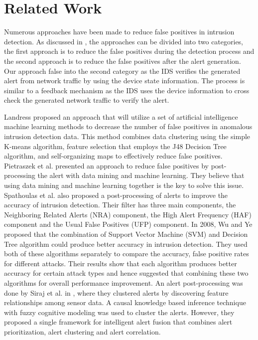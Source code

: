 \documentclass[letterpaper, 10 pt, conference]{ieeeconf}  %
\begin{document}
\section{Related Work}
Numerous approaches have been made to reduce false positives in intrusion detection. As discussed in \cite{c30}, the approaches can be divided into two categories, the first approach is to reduce the false positives during the detection process and the second approach is to reduce the false positives after the alert generation. Our approach false into the second category as the IDS verifies the generated alert from network traffic by using the device state information. The process is similar to a feedback mechanism as the IDS uses the device information to cross check the generated network traffic to verify the alert.

Landress \cite{c25} proposed an approach that will utilize a set of artificial intelligence machine learning methods to decrease the number of false positives in anomalous intrusion detection data. This method combines data clustering using the simple K-means algorithm, feature selection that employs the J48 Decision Tree algorithm, and self-organizing maps to effectively reduce false positives.
Pietraszek et al. \cite{c26} presented an approach to reduce false positives by post-processing the alert with data mining and machine learning. They believe that using data mining and machine learning together is the key to solve this issue.
Spathoulas et al. \cite{c27} also proposed a post-processing of alerts to improve the accuracy of intrusion detection. Their filter has three main components, the Neighboring Related Alerts (NRA) component, the High Alert Frequency (HAF) component and the Usual False Positives (UFP) component.
In 2008, Wu and Ye \cite{c31} proposed that the combination of Support Vector Machine (SVM) and Decision Tree algorithm could produce better accuracy in intrusion detection. They used both of these algorithms separately to compare the accuracy, false positive rates for different attacks. Their results show that each algorithm produces better accuracy for certain attack types and hence suggested that combining these two algorithms for overall performance improvement. 
An alert post-processing was done by Siraj et al. in \cite{c32}, where they clustered alerts by discovering feature relationships among sensor data. A causal knowledge based inference technique with fuzzy cognitive modeling was used to cluster the alerts. However, they proposed a single framework for intelligent alert fusion that combines alert prioritization, alert clustering and alert correlation.
\end{document}
